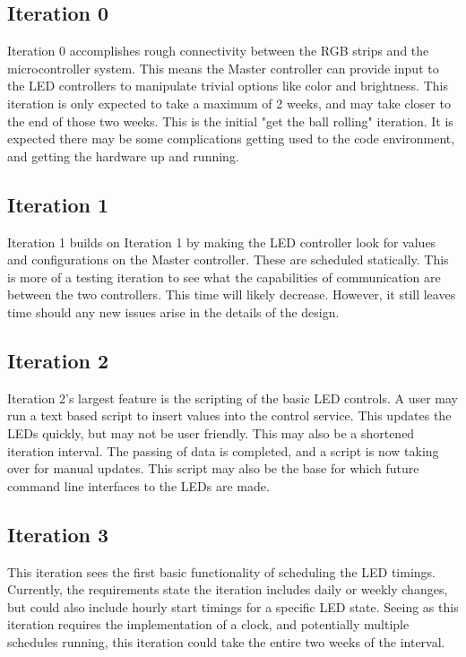 \documentclass[onecolumn, draftclsnofoot,10pt, compsoc]{IEEEtran}
\begin{document}
		\subsection{Iteration 0}
		Iteration 0 accomplishes rough connectivity between the RGB strips and the microcontroller system. This means the Master controller can provide input
		to the LED controllers to manipulate trivial options like color and brightness. This iteration is only expected to take a maximum of 2 weeks, and may
		take closer to the end of those two weeks. This is the initial "get the ball rolling" iteration. It is expected there may be some complications
		getting used to the code environment, and getting the hardware up and running.

		\subsection{Iteration 1}
		Iteration 1 builds on Iteration 1 by making the LED controller look for values and configurations on the Master controller. These are scheduled
		statically. This is more of a testing iteration to see what the capabilities of communication are between the two controllers. This time will likely decrease.
		However, it still leaves time should any new issues arise in the details of the design.

		\subsection{Iteration 2}
		Iteration 2's largest feature is the scripting of the basic LED controls. A user may run a text based script to insert values into the control
		service. This updates the LEDs quickly, but may not be user friendly. This may also be a shortened iteration interval. The passing of
		data is completed, and a script is now taking over for manual updates. This script may also be the base for which future command line interfaces to the
		LEDs are made.

		\subsection{Iteration 3}
		This iteration sees the first basic functionality of scheduling the LED timings. Currently, the requirements state the iteration includes daily or
		weekly changes, but could also include hourly start timings for a specific LED state. Seeing as this iteration requires the implementation of a clock,
		and potentially multiple schedules running, this iteration could take the entire two weeks of the interval.
\end{document}
